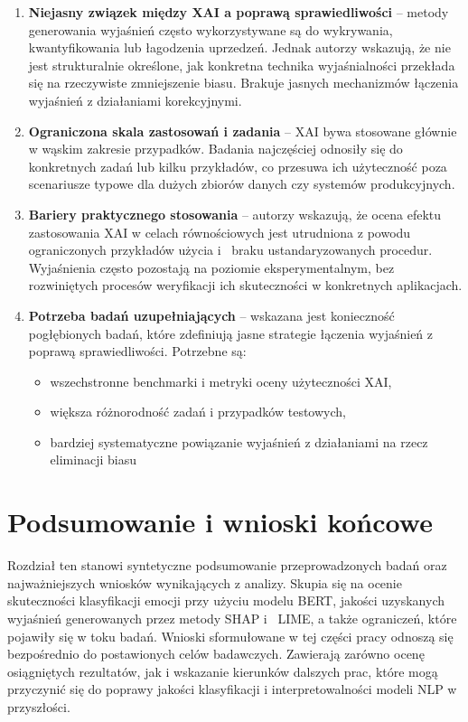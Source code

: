 \documentclass[wmii, inf, mgr]{uwmthesis}
\begin{document}
\begin{enumerate}
    \item \textbf{Niejasny związek między XAI a poprawą sprawiedliwości} -- metody generowania wyjaśnień często wykorzystywane są do wykrywania, kwantyfikowania lub łagodzenia uprzedzeń. Jednak autorzy wskazują, że nie jest strukturalnie określone, jak konkretna technika wyjaśnialności przekłada się na rzeczywiste zmniejszenie biasu. Brakuje jasnych mechanizmów łączenia wyjaśnień z działaniami korekcyjnymi.

    \item \textbf{Ograniczona skala zastosowań i zadania} -- XAI bywa stosowane głównie w wąskim zakresie przypadków. Badania najczęściej odnosiły się do konkretnych zadań lub kilku przykładów, co przesuwa ich użyteczność poza scenariusze typowe dla dużych zbiorów danych czy systemów produkcyjnych.

    \item \textbf{Bariery praktycznego stosowania} -- autorzy wskazują, że ocena efektu zastosowania XAI w celach równościowych jest utrudniona z powodu ograniczonych przykładów użycia i~ braku ustandaryzowanych procedur. Wyjaśnienia często pozostają na poziomie eksperymentalnym, bez rozwiniętych procesów weryfikacji ich skuteczności w konkretnych aplikacjach.

    \item \textbf{Potrzeba badań uzupełniających} -- wskazana jest konieczność pogłębionych badań, które zdefiniują jasne strategie łączenia wyjaśnień z poprawą sprawiedliwości. Potrzebne są:
    \begin{itemize}
        \item wszechstronne benchmarki i metryki oceny użyteczności XAI,

        \item większa różnorodność zadań i przypadków testowych,

        \item bardziej systematyczne powiązanie wyjaśnień z działaniami na rzecz eliminacji biasu
    \end{itemize}
    
\end{enumerate}

\chapter{Podsumowanie i wnioski końcowe}
Rozdział ten stanowi syntetyczne podsumowanie przeprowadzonych badań oraz najważniejszych wniosków wynikających z analizy. Skupia się na ocenie skuteczności klasyfikacji emocji przy użyciu modelu BERT, jakości uzyskanych wyjaśnień generowanych przez metody SHAP i~ LIME, a także ograniczeń, które pojawiły się w toku badań. Wnioski sformułowane w tej części pracy odnoszą się bezpośrednio do postawionych celów badawczych. Zawierają zarówno ocenę osiągniętych rezultatów, jak i wskazanie kierunków dalszych prac, które mogą przyczynić się do poprawy jakości klasyfikacji i interpretowalności modeli NLP w przyszłości.
\end{document}
